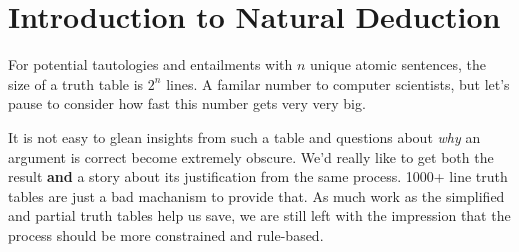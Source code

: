 \section{Introduction to Natural Deduction}

For potential tautologies and entailments with $n$ unique atomic sentences,
the size of a truth table is $2^n$ lines. A familar number to computer
scientists, but let's pause to consider how fast this number gets very very big.


It is not easy to glean insights from such a table and questions about
\emph{why} an argument is correct become extremely obscure. We'd really like
to get both the result \textbf{and} a story about its justification from the
same process. 1000+ line truth tables are just a bad machanism to provide that.
As much work as the simplified and partial truth tables help us save, we are
still left with the impression that the process should be more constrained and
rule-based.

